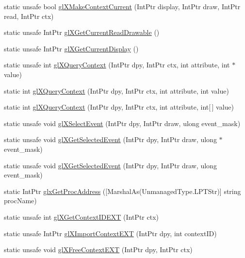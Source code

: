 \begin{DoxyCompactItemize}
\item 
static unsafe bool \hyperlink{class_tao_1_1_platform_1_1_x11_1_1_glx_a6a51e367d9bbeecd9bd6b8162ac4967f}{glXMakeContextCurrent} (IntPtr display, IntPtr draw, IntPtr read, IntPtr ctx)
\item 
static unsafe IntPtr \hyperlink{class_tao_1_1_platform_1_1_x11_1_1_glx_afc6b6a351d8e158cf16a03fe07c5463c}{glXGetCurrentReadDrawable} ()
\item 
static unsafe IntPtr \hyperlink{class_tao_1_1_platform_1_1_x11_1_1_glx_a83e8d6bfcc89e1ff06b86425368d3a9c}{glXGetCurrentDisplay} ()
\item 
static unsafe int \hyperlink{class_tao_1_1_platform_1_1_x11_1_1_glx_af74af1bfbd00bc7dc377531788e2af0c}{glXQueryContext} (IntPtr dpy, IntPtr ctx, int attribute, int $\ast$value)
\item 
static int \hyperlink{class_tao_1_1_platform_1_1_x11_1_1_glx_a94ccb13e2eebc082e2a7707e050b4785}{glXQueryContext} (IntPtr dpy, IntPtr ctx, int attribute, int value)
\item 
static int \hyperlink{class_tao_1_1_platform_1_1_x11_1_1_glx_ab715ccebc3ccefc92ce00e18c9c36dd9}{glXQueryContext} (IntPtr dpy, IntPtr ctx, int attribute, int\mbox{[}$\,$\mbox{]} value)
\item 
static unsafe void \hyperlink{class_tao_1_1_platform_1_1_x11_1_1_glx_aa03daf6f550238f29f5036208859a240}{glXSelectEvent} (IntPtr dpy, IntPtr draw, ulong event\_\-mask)
\item 
static unsafe void \hyperlink{class_tao_1_1_platform_1_1_x11_1_1_glx_ada88d89b581e193cfd6af56d5ecca8cd}{glXGetSelectedEvent} (IntPtr dpy, IntPtr draw, ulong $\ast$event\_\-mask)
\item 
static unsafe void \hyperlink{class_tao_1_1_platform_1_1_x11_1_1_glx_a370c2626d6446a467674b91e047e25da}{glXGetSelectedEvent} (IntPtr dpy, IntPtr draw, ulong event\_\-mask)
\item 
static IntPtr \hyperlink{class_tao_1_1_platform_1_1_x11_1_1_glx_a323d57dc78e4862e88042e2c8b926ff6}{glxGetProcAddress} (\mbox{[}MarshalAs(UnmanagedType.LPTStr)\mbox{]} string procName)
\item 
static unsafe int \hyperlink{class_tao_1_1_platform_1_1_x11_1_1_glx_a5e038b6c0ed8284bd8512cfee58c4e86}{glXGetContextIDEXT} (IntPtr ctx)
\item 
static unsafe IntPtr \hyperlink{class_tao_1_1_platform_1_1_x11_1_1_glx_a97fbe540985c5bed7488ecfe2f0cdb56}{glXImportContextEXT} (IntPtr dpy, int contextID)
\item 
static unsafe void \hyperlink{class_tao_1_1_platform_1_1_x11_1_1_glx_a719fe5c1d11571765f5b9c1373a08d94}{glXFreeContextEXT} (IntPtr dpy, IntPtr ctx)

\end{DoxyCompactItemize}
